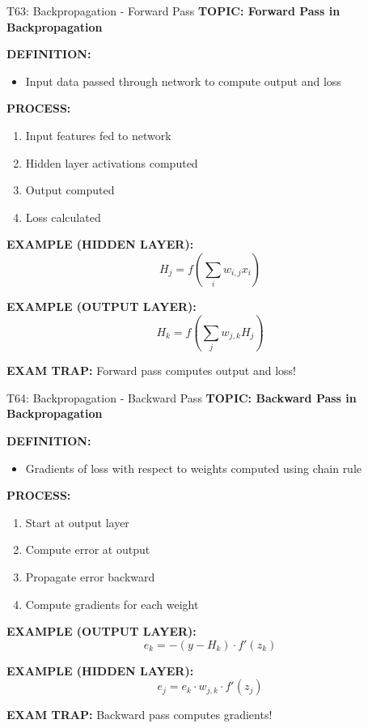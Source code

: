 \documentclass[8pt]{beamer}
\begin{document}
	\begin{frame}{T63: Backpropagation - Forward Pass}
		\fontsize{6.5}{7.5}\selectfont
		\textbf{TOPIC: Forward Pass in Backpropagation}
		
		\vspace{0.1cm}
		\textbf{DEFINITION:}
		\begin{itemize}
			\item Input data passed through network to compute output and loss
		\end{itemize}
		
		\vspace{0.1cm}
		\textbf{PROCESS:}
		\begin{enumerate}
			\item Input features fed to network
			\item Hidden layer activations computed
			\item Output computed
			\item Loss calculated
		\end{enumerate}
		
		\vspace{0.1cm}
		\textbf{EXAMPLE (HIDDEN LAYER):}
		\[
		H_j = f\left(\sum_i w_{i,j} x_i\right)
		\]
		
		\vspace{0.1cm}
		\textbf{EXAMPLE (OUTPUT LAYER):}
		\[
		H_k = f\left(\sum_j w_{j,k} H_j\right)
		\]
		
		\textcolor{myred}{\textbf{EXAM TRAP:}} Forward pass computes \textcolor{myblue}{output and loss}!
	\end{frame}
	
	\begin{frame}{T64: Backpropagation - Backward Pass}
		\fontsize{6.5}{7.5}\selectfont
		\textbf{TOPIC: Backward Pass in Backpropagation}
		
		\vspace{0.1cm}
		\textbf{DEFINITION:}
		\begin{itemize}
			\item Gradients of loss with respect to weights computed using chain rule
		\end{itemize}
		
		\vspace{0.1cm}
		\textbf{PROCESS:}
		\begin{enumerate}
			\item Start at output layer
			\item Compute error at output
			\item Propagate error backward
			\item Compute gradients for each weight
		\end{enumerate}
		
		\vspace{0.1cm}
		\textbf{EXAMPLE (OUTPUT LAYER):}
		\[
		e_k = -(y - H_k) \cdot f'(z_k)
		\]
		
		\vspace{0.1cm}
		\textbf{EXAMPLE (HIDDEN LAYER):}
		\[
		e_j = e_k \cdot w_{j,k} \cdot f'(z_j)
		\]
		
		\textcolor{myred}{\textbf{EXAM TRAP:}} Backward pass computes \textcolor{myblue}{gradients}!
	\end{frame}
	
\end{document}

